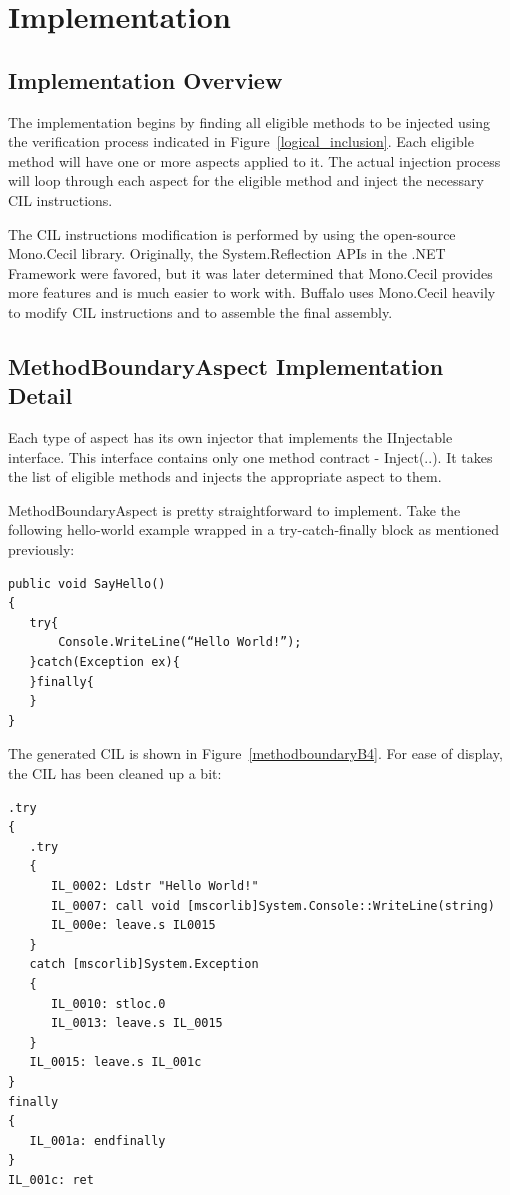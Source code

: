 \chapter{Implementation}

\section{Implementation Overview}

The implementation begins by finding all eligible methods to be injected using the verification process indicated in Figure~\ref{logical_inclusion}. Each eligible method will have one or more aspects applied to it. The actual injection process will loop through each aspect for the eligible method and inject the necessary CIL instructions.

The CIL instructions modification is performed by using the open-source Mono.Cecil library. Originally, the System.Reflection APIs in the .NET Framework were favored, but it was later determined that Mono.Cecil provides more features and is much easier to work with. Buffalo uses Mono.Cecil heavily to modify CIL instructions and to assemble the final assembly.

\section{MethodBoundaryAspect Implementation Detail}

Each type of aspect has its own injector that implements the IInjectable interface. This interface contains only one method contract - Inject(..). It takes the list of eligible methods and injects the appropriate aspect to them.

MethodBoundaryAspect is pretty straightforward to implement. Take the following hello-world example wrapped in a try-catch-finally block as mentioned previously:

\begin{minipage}{\textwidth}
\begin{lstlisting}[caption={SayHello Function}, label=sayhello]
public void SayHello()
{
   try{
       Console.WriteLine(“Hello World!”);
   }catch(Exception ex){
   }finally{
   }
}
\end{lstlisting}
\end{minipage}

The generated CIL is shown in Figure~\ref{methodboundaryB4}. For ease of display, the CIL has been cleaned up a bit:

\begin{minipage}{\textwidth}
\begin{lstlisting}[caption={CIL Generated for Sample C\# Function}, label=methodboundaryB4]
.try
{
   .try
   {
      IL_0002: Ldstr "Hello World!"
      IL_0007: call void [mscorlib]System.Console::WriteLine(string)
      IL_000e: leave.s IL0015
   }
   catch [mscorlib]System.Exception
   {
      IL_0010: stloc.0
      IL_0013: leave.s IL_0015
   }
   IL_0015: leave.s IL_001c
}
finally
{
   IL_001a: endfinally
}
IL_001c: ret
\end{lstlisting}
\end{minipage}


